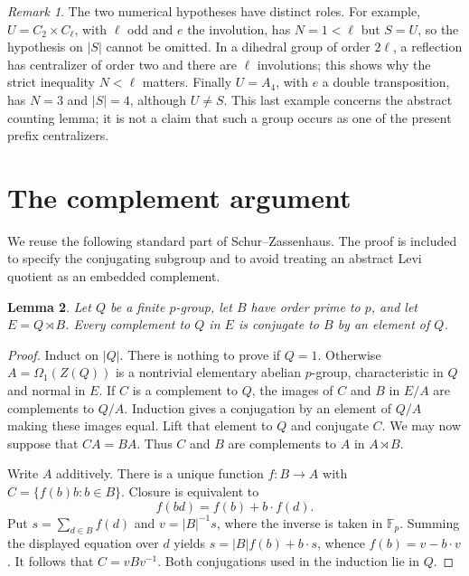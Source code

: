 \documentclass[11pt]{article}
\newtheorem{lemma}{Lemma}
\theoremstyle{remark}\newtheorem{remark}[lemma]{Remark}
\begin{document}
\begin{remark}
The two numerical hypotheses have distinct roles. For example,
$U=C_2\times C_\ell$, with $\ell$ odd and $e$ the involution, has
$N=1<\ell$ but $S=U$, so the hypothesis on $|S|$ cannot be omitted.
In a dihedral group of order $2\ell$, a reflection has centralizer of
order two and there are $\ell$ involutions; this shows why the strict
inequality $N<\ell$ matters. Finally $U=A_4$, with $e$ a double
transposition, has $N=3$ and $|S|=4$, although $U\ne S$.
This last example concerns the abstract counting lemma; it is not a
claim that such a group occurs as one of the present prefix centralizers.
\end{remark}

\section{The complement argument}

We reuse the following standard part of Schur--Zassenhaus. The proof
is included to specify the conjugating subgroup and to avoid treating
an abstract Levi quotient as an embedded complement.

\begin{lemma}\label{complement}
Let $Q$ be a finite $p$-group, let $B$ have order prime to $p$, and
let $E=Q\rtimes B$. Every complement to $Q$ in $E$ is conjugate to
$B$ by an element of $Q$.
\end{lemma}
\begin{proof}
Induct on $|Q|$. There is nothing to prove if $Q=1$.
Otherwise $A=\Omega_1(Z(Q))$ is a nontrivial elementary abelian
$p$-group, characteristic in $Q$ and normal in $E$.
If $C$ is a complement to $Q$, the images of $C$ and $B$ in $E/A$
are complements to $Q/A$. Induction gives a conjugation by an element
of $Q/A$ making these images equal. Lift that element to $Q$ and
conjugate $C$. We may now suppose that $CA=BA$.
Thus $C$ and $B$ are complements to $A$ in $A\rtimes B$.

Write $A$ additively. There is a unique function $f:B\to A$ with
$C=\{f(b)b:b\in B\}$. Closure is equivalent to
\[
 f(bd)=f(b)+b\cdot f(d).
\]
Put $s=\sum_{d\in B}f(d)$ and $v=|B|^{-1}s$, where the inverse
is taken in $\mathbb F_p$. Summing the displayed equation over $d$
yields $s=|B|f(b)+b\cdot s$, whence
$f(b)=v-b\cdot v$. It follows that $C=vBv^{-1}$.
Both conjugations used in the induction lie in $Q$.
\end{proof}
\end{document}
